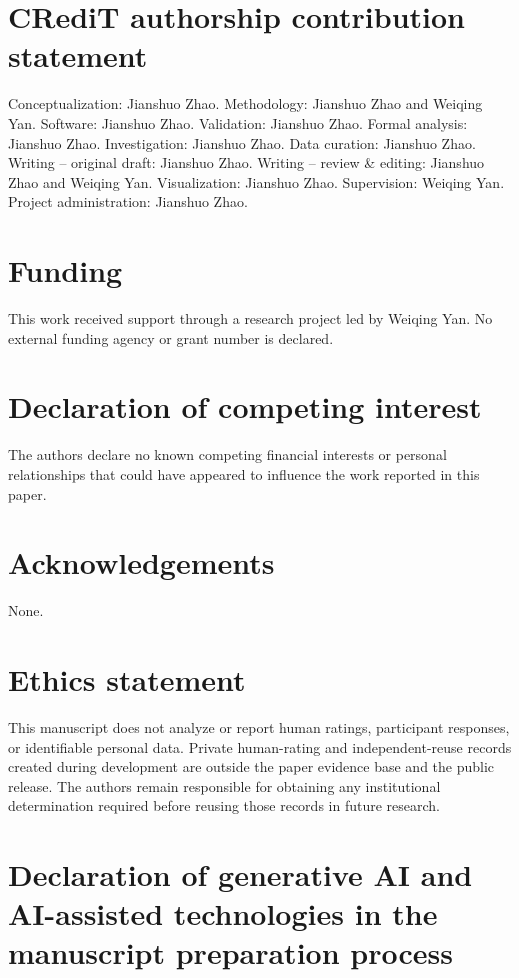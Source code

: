 \documentclass[preprint,12pt,a4paper]{elsarticle}
\begin{document}
\section*{CRediT authorship contribution statement}

Conceptualization: Jianshuo Zhao. Methodology: Jianshuo Zhao and Weiqing Yan.
Software: Jianshuo Zhao. Validation: Jianshuo Zhao. Formal analysis: Jianshuo
Zhao. Investigation: Jianshuo Zhao. Data curation: Jianshuo Zhao. Writing --
original draft: Jianshuo Zhao. Writing -- review \& editing: Jianshuo Zhao and
Weiqing Yan. Visualization: Jianshuo Zhao. Supervision: Weiqing Yan. Project
administration: Jianshuo Zhao.

\section*{Funding}

This work received support through a research project led by Weiqing Yan. No
external funding agency or grant number is declared.

\section*{Declaration of competing interest}

The authors declare no known competing financial interests or personal
relationships that could have appeared to influence the work reported in this
paper.

\section*{Acknowledgements}

None.

\section*{Ethics statement}

This manuscript does not analyze or report human ratings, participant responses,
or identifiable personal data. Private human-rating and independent-reuse
records created during development are outside the paper evidence base and the
public release. The authors remain responsible for obtaining any institutional
determination required before reusing those records in future research.

\section*{Declaration of generative AI and AI-assisted technologies in the
manuscript preparation process}
\end{document}
